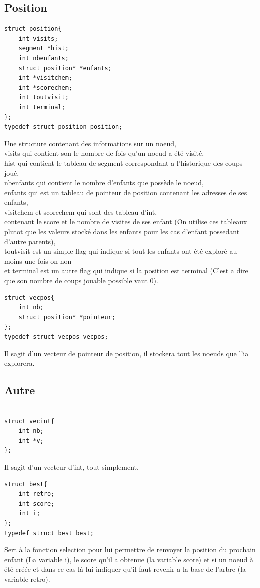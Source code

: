 \documentclass[11pt]{article}
\begin{document}
\subsection{Position}
				\begin{lstlisting}
struct position{
	int visits;
	segment *hist;
	int nbenfants;
	struct position* *enfants;
	int *visitchem;
	int *scorechem;
	int toutvisit;
	int terminal;
};
typedef struct position position;

\end{lstlisting}
Une structure contenant des informations sur un noeud,\\visits qui contient son le nombre de fois qu'un noeud a été visité,\\hist qui contient le tableau de segment correspondant a l'historique des coups joué,\\nbenfants qui contient le nombre d'enfants que possède le noeud,\\enfants qui est un tableau de pointeur de position contenant les adresses de ses enfants,\\visitchem et scorechem qui sont des tableau d'int,\\contenant le score et le nombre de visites de ses enfant (On utilise ces tableaux plutot que les valeurs stocké dans les enfants pour les cas d'enfant possedant d'autre parents),\\toutvisit est un simple flag qui indique si tout les enfants ont été exploré au moins une fois on non\\et terminal est un autre flag qui indique si la position est terminal (C'est a dire que son nombre de coups jouable possible vaut 0).\\
	\begin{lstlisting}
struct vecpos{
	int nb;
	struct position* *pointeur;
};
typedef struct vecpos vecpos;

\end{lstlisting}
Il sagit d'un vecteur de pointeur de position, il stockera tout les noeuds que l'ia explorera.\\
\subsection{Autre}
	\begin{lstlisting}

struct vecint{
	int nb;
	int *v;
};

\end{lstlisting}
Il sagit d'un vecteur d'int, tout simplement.\\
	\begin{lstlisting}
struct best{
	int retro;
	int score;
	int i;
};
typedef struct best best;

\end{lstlisting}
Sert à la fonction selection pour lui permettre de renvoyer la position du prochain enfant (La variable i), le score qu'il a obtenue (la variable score) et si un noeud à été créée et dans ce cas là lui indiquer qu'il faut revenir a la base de l'arbre (la variable retro).\\
\end{document}
